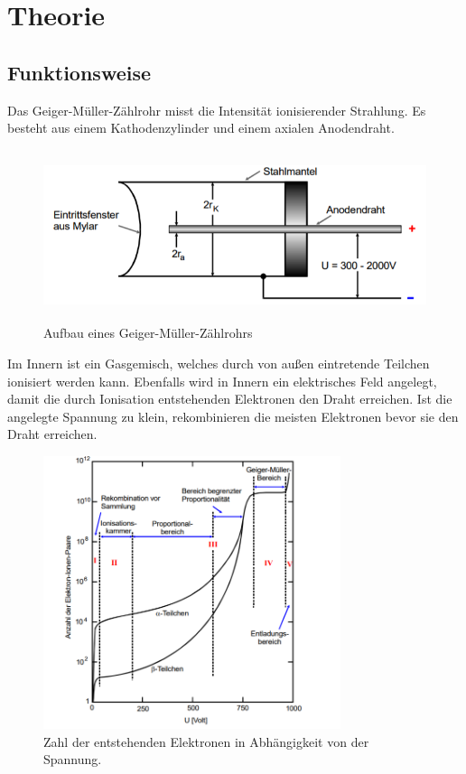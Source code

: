 \section{Theorie}
\label{sec:Theorie}



\subsection{Funktionsweise}
Das Geiger-Müller-Zählrohr misst die Intensität ionisierender Strahlung. Es besteht aus einem Kathodenzylinder und einem axialen
Anodendraht.

\begin{figure}[H]
  \centering
  \includegraphics[height=5cm]{geigerzaehler.PNG}
  \caption{Aufbau eines Geiger-Müller-Zählrohrs \cite{sample}}
  \label{fig:Linienspektrum}
\end{figure}

 Im Innern ist ein Gasgemisch, welches durch von außen eintretende Teilchen ionisiert werden kann. Ebenfalls wird in Innern ein elektrisches
 Feld angelegt, damit die durch Ionisation entstehenden Elektronen den Draht erreichen. Ist die angelegte Spannung zu klein,
 rekombinieren die meisten Elektronen bevor sie den Draht erreichen.

 \begin{figure}[H]
   \centering
   \includegraphics[height=8cm]{zonen.PNG}
   \caption{Zahl der entstehenden Elektronen in Abhängigkeit von der Spannung. \cite{sample}}
   \label{fig:Linienspektrum}
 \end{figure}

